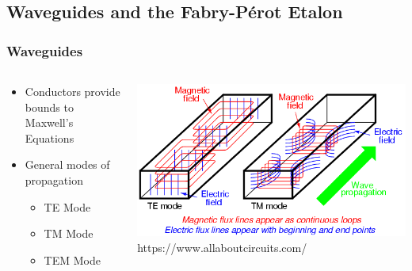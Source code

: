 \documentclass{beamer}
\begin{document}
    \subsection{Waveguides and the Fabry-P\'erot Etalon}
        \begin{frame}
            \frametitle{Waveguides}
            \begin{columns}
				\begin{column}{0.4\textwidth}
					\begin{itemize}
						\item Conductors provide bounds to Maxwell's Equations
						\vspace{0.5cm}
						\item General modes of propagation
						\begin{itemize}
							\item TE Mode
							\item TM Mode
							\item TEM Mode
						\end{itemize}
					\end{itemize}

				\end{column}
				\begin{column}{0.6\textwidth}
					\centering
					\includegraphics[width=\textwidth]{images/te_tm.png}
					\tiny https://www.allaboutcircuits.com/
				\end{column}

            \end{columns}

        \end{frame}
        
\end{document}
